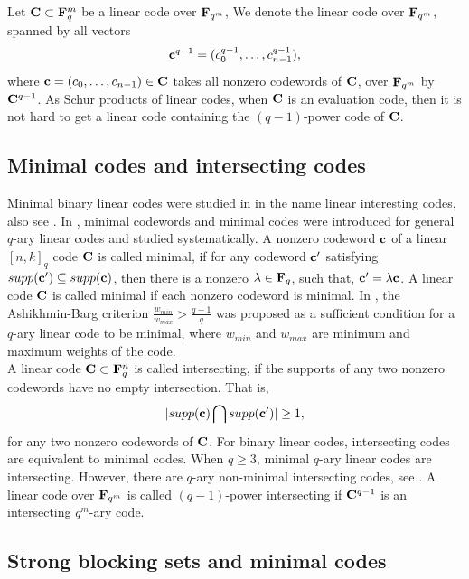 \documentclass[10pt,a4paper]{article}
\begin{document}
Let ${\bf C} \subset {\bf F}_q^m$ be a linear code over ${\bf F}_{q^m}$, We denote the linear code over ${\bf F}_{q^m}$, spanned by all vectors $${\bf c}^{q-1}=(c_0^{q-1}, \ldots, c_{n-1}^{q-1}),$$ where ${\bf c}=(c_0,\ldots, c_{n-1})\in {\bf C}$ takes all nonzero codewords of ${\bf C}$, over ${\bf F}_{q^m}$ by ${\bf C}^{q-1}$. As Schur products of linear codes, when ${\bf C}$ is an evaluation code, then it is not hard to get a linear code containing the $(q-1)$-power code of ${\bf C}$.\\



\subsection{Minimal codes and intersecting codes}


Minimal binary linear codes were studied in \cite{CL} in the name linear interesting codes, also see \cite{Borello}. In \cite{AB}, minimal codewords and minimal codes were introduced for general $q$-ary linear codes and studied systematically.  A nonzero codeword ${\bf c}$ of a linear $[n,k]_q$ code ${\bf C}$ is called minimal, if for any codeword ${\bf c}'$ satisfying $supp({\bf c}') \subseteq supp({\bf c})$, then there is a nonzero $\lambda \in {\bf F}_q$, such that, ${\bf c}'=\lambda {\bf c}$. A linear code ${\bf C}$ is called minimal if each nonzero codeword is minimal. In \cite{AB}, the Ashikhmin-Barg criterion $\frac{w_{min}}{w_{max}} > \frac{q-1}{q}$ was proposed as a sufficient condition for a $q$-ary linear code to be minimal, where $w_{min}$ and $w_{max}$ are minimum and maximum weights of the code. \\


A linear code ${\bf C} \subset {\bf F}_q^n$ is called intersecting, if the supports of any two nonzero codewords have no empty intersection. That is, $$|supp({\bf c}) \bigcap supp({\bf c}')|\geq 1,$$ for any two nonzero codewords of ${\bf C}$. For binary linear codes, intersecting codes are equivalent to minimal codes. When $q \geq 3$, minimal $q$-ary linear codes are intersecting. However, there are $q$-ary non-minimal intersecting codes, see \cite{CL,CZ,Borello}. A linear code over ${\bf F}_{q^m}$ is called $(q-1)$-power intersecting if ${\bf C}^{q-1}$ is an intersecting $q^m$-ary code.\\







\subsection{Strong blocking sets and minimal codes}
\end{document}
